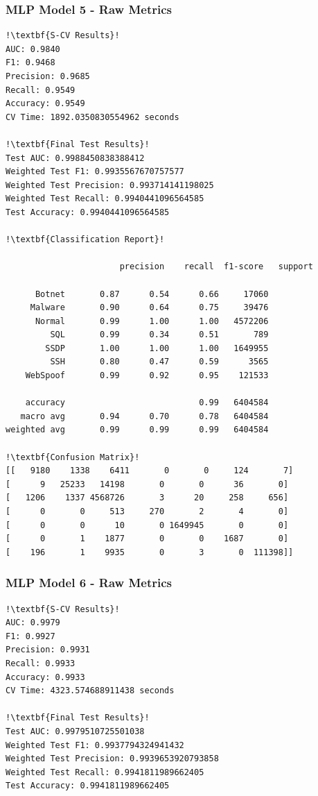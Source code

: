 \begin{appendices}
\subsubsection{MLP Model 5 - Raw Metrics}
\begin{lstlisting}[escapechar=!]
!\textbf{S-CV Results}!
AUC: 0.9840
F1: 0.9468
Precision: 0.9685
Recall: 0.9549
Accuracy: 0.9549
CV Time: 1892.0350830554962 seconds

!\textbf{Final Test Results}!
Test AUC: 0.9988450838388412
Weighted Test F1: 0.9935567670757577
Weighted Test Precision: 0.993714141198025
Weighted Test Recall: 0.9940441096564585
Test Accuracy: 0.9940441096564585

!\textbf{Classification Report}!

			           precision    recall  f1-score   support

      Botnet       0.87      0.54      0.66     17060
     Malware       0.90      0.64      0.75     39476
      Normal       0.99      1.00      1.00   4572206
         SQL       0.99      0.34      0.51       789
        SSDP       1.00      1.00      1.00   1649955
         SSH       0.80      0.47      0.59      3565
    WebSpoof       0.99      0.92      0.95    121533

    accuracy                           0.99   6404584
   macro avg       0.94      0.70      0.78   6404584
weighted avg       0.99      0.99      0.99   6404584
    
!\textbf{Confusion Matrix}!    
[[   9180    1338    6411       0       0     124       7]
[      9   25233   14198       0       0      36       0]
[   1206    1337 4568726       3      20     258     656]
[      0       0     513     270       2       4       0]
[      0       0      10       0 1649945       0       0]
[      0       1    1877       0       0    1687       0]
[    196       1    9935       0       3       0  111398]]

\end{lstlisting}


\subsubsection{MLP Model 6 - Raw Metrics}
\begin{lstlisting}[escapechar=!]
!\textbf{S-CV Results}!
AUC: 0.9979
F1: 0.9927
Precision: 0.9931
Recall: 0.9933
Accuracy: 0.9933
CV Time: 4323.574688911438 seconds

!\textbf{Final Test Results}!
Test AUC: 0.9979510725501038
Weighted Test F1: 0.9937794324941432
Weighted Test Precision: 0.9939653920793858
Weighted Test Recall: 0.9941811989662405
Test Accuracy: 0.9941811989662405


\end{lstlisting}
\end{appendices}

